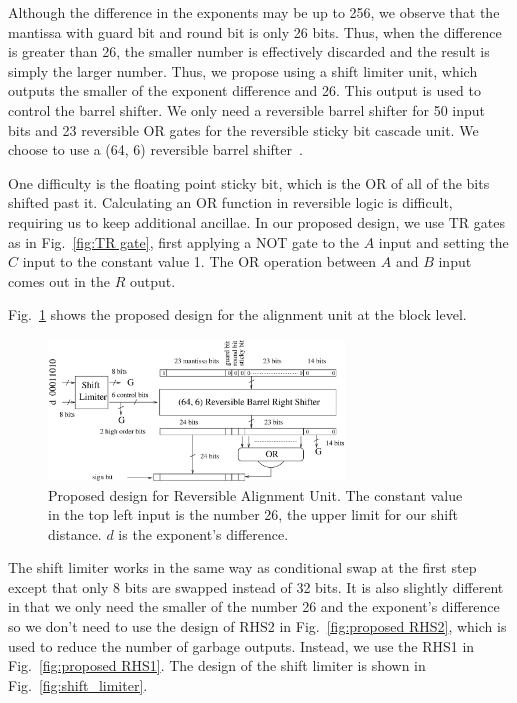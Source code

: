 \documentclass[%
reprint,
 amsmath,amssymb,
 aps,
]{revtex4-1}
\begin{document}
\par Although the difference in the exponents may be up to 256, we observe that the mantissa with guard bit and round bit is only 26 bits. Thus, when the difference is greater than 26, the smaller number is effectively discarded and the result is simply the larger number. Thus, we propose using a shift limiter unit, which outputs the smaller of the exponent difference and 26. This output is used to control the barrel shifter. We only need a reversible barrel shifter for 50 input bits and 23 reversible OR gates for the reversible sticky bit cascade unit. We choose to use a (64, 6) reversible barrel shifter~\cite{efficient-barrel}. 

\par One difficulty is the floating point sticky bit, which is the OR of all of the bits shifted past it. Calculating an OR function in reversible logic is difficult, requiring us to keep additional ancillae. In our proposed design, we use TR gates as in Fig.~\ref{fig:TR gate}, first applying a NOT gate to the $A$ input and setting the $C$ input to the constant value 1. The OR operation between $A$ and $B$ input comes out in the $R$ output.

Fig.~\ref{fig:proposed_align} shows the proposed design for the alignment unit at the block level.

\begin{figure}[ht]
\centering
\includegraphics[width=0.7\textwidth]{proposed-alignment.eps}
\caption{Proposed design for Reversible Alignment Unit. The constant value in the top left input is the number 26, the upper limit for our shift distance. $d$ is the exponent's difference.}
\label{fig:proposed_align}
\end{figure} 


\par The shift limiter works in the same way as conditional swap at the first step except that only 8 bits are swapped instead of 32 bits. It is also slightly different in that we only need the smaller of the number 26 and the exponent's difference so we don't need to use the design of RHS2 in Fig.~\ref{fig:proposed RHS2}, which is used to reduce the number of garbage outputs. Instead, we use the RHS1 in Fig.~\ref{fig:proposed RHS1}. The design of the shift limiter is shown in Fig.~\ref{fig:shift_limiter}.
\end{document}
